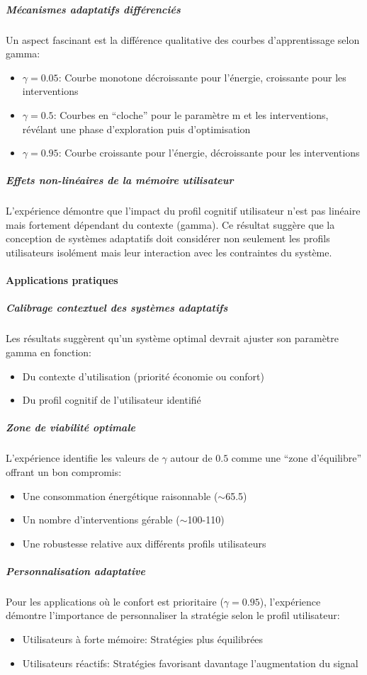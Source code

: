 \documentclass[a4paper,11pt]{article}
\begin{document}
\subparagraph{Mécanismes adaptatifs différenciés}
Un aspect fascinant est la différence qualitative des courbes d'apprentissage selon gamma:
\begin{itemize}
    \item $\gamma=0.05$: Courbe monotone décroissante pour l'énergie, croissante pour les interventions
    \item $\gamma=0.5$: Courbes en ``cloche'' pour le paramètre m et les interventions, révélant une phase d'exploration puis d'optimisation
    \item $\gamma=0.95$: Courbe croissante pour l'énergie, décroissante pour les interventions
\end{itemize}

\subparagraph{Effets non-linéaires de la mémoire utilisateur}
L'expérience démontre que l'impact du profil cognitif utilisateur n'est pas linéaire mais fortement dépendant du contexte (gamma). Ce résultat suggère que la conception de systèmes adaptatifs doit considérer non seulement les profils utilisateurs isolément mais leur interaction avec les contraintes du système.

\paragraph{Applications pratiques}

\subparagraph{Calibrage contextuel des systèmes adaptatifs}
Les résultats suggèrent qu'un système optimal devrait ajuster son paramètre gamma en fonction:
\begin{itemize}
    \item Du contexte d'utilisation (priorité économie ou confort)
    \item Du profil cognitif de l'utilisateur identifié
\end{itemize}

\subparagraph{Zone de viabilité optimale}
L'expérience identifie les valeurs de  $\gamma$ autour de $0.5$ comme une ``zone d'équilibre'' offrant un bon compromis:
\begin{itemize}
    \item Une consommation énergétique raisonnable ($\sim$65.5)
    \item Un nombre d'interventions gérable ($\sim$100-110)
    \item Une robustesse relative aux différents profils utilisateurs
\end{itemize}

\subparagraph{Personnalisation adaptative}
Pour les applications où le confort est prioritaire ($\gamma=0.95$), l'expérience démontre l'importance de personnaliser la stratégie selon le profil utilisateur:
\begin{itemize}
    \item Utilisateurs à forte mémoire: Stratégies plus équilibrées
    \item Utilisateurs réactifs: Stratégies favorisant davantage l'augmentation du signal
\end{itemize}
\end{document}
